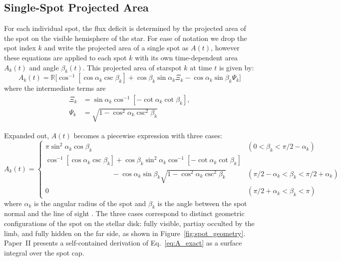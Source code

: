 \documentclass[preprint]{aastex702}
\begin{document}
\subsection{Single-Spot Projected Area}

For each individual spot, the flux deficit is determined by the projected area of the spot on the visible hemisphere of the star. For ease of notation we drop the spot index $k$ and write the projected area of a single spot as $A(t)$, however these equations are applied to each spot $k$ with its own time-dependent area $A_k(t)$ and angle $\beta_k(t)$. This projected area of starspot $k$ at time $t$ is given by:
\begin{equation}
    A_k(t) 
        = \mathbb{R}\Big[ \cos^{-1}[\cos\alpha_k\csc\beta_k]
        + \cos\beta_k\sin\alpha_k \Xi_k - \cos\alpha_k\sin\beta_k \Psi_k \Big]
\end{equation}
where the intermediate terms are
\begin{align}
    \Xi_k &= \sin\alpha_{k}\cos^{-1}[-\cot\alpha_{k}\cot\beta_{k}],\\
    \Psi_k &= \sqrt{1-\cos^2\alpha_k\csc^2\beta_k}
\end{align}

Expanded out, $A(t)$ becomes a piecewise expression with three cases:
\begin{equation}
  A_{k}(t) = \left\{ \begin{array}{ll}
    \pi \sin^2\alpha_{k} \cos \beta_{k} & (0< \beta_{k} < \pi/2 -\alpha_{k}) \\[6pt]
    \cos^{-1}[\cos \alpha_{k} \csc \beta_{k}]  +\cos \beta_{k} \sin^2 \alpha_{k} \cos^{-1}[-\cot \alpha_{k} \cot \beta_{k}] & \\
    \hspace{4cm} - \cos \alpha_{k} \sin \beta_{k} \sqrt{1-\cos^2 \alpha_{k} \csc^2 \beta_{k}} & (\pi/2 -\alpha_{k} < \beta_{k} < \pi/2 +\alpha_{k}) \\[6pt]
    0 & (\pi/2 +\alpha_{k} < \beta_{k} < \pi)
  \end{array} \right.
  \label{eq:A_exact}
\end{equation}
where $\alpha_k$ is the angular radius of the spot and $\beta_k$ is the angle between the spot normal and the line of sight \citep{kipping_analytic_2012}. The three cases correspond to distinct geometric configurations of the spot on the stellar disk: fully visible, partiay occulted by the limb, and fully hidden on the far side, as shown in Figure~\ref{fig:spot_geometry}. Paper~II presents a self-contained derivation of Eq.~\eqref{eq:A_exact} as a surface integral over the spot cap.
\end{document}
